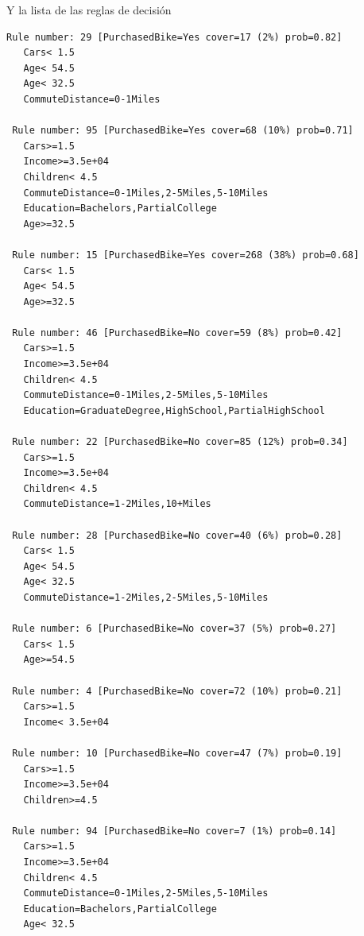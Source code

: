 \documentclass[11pt,a4paper]{report}
\begin{document}
\begin{itemize}
Y la lista de las reglas de decisión
\begin{verbatim}
Rule number: 29 [PurchasedBike=Yes cover=17 (2%) prob=0.82]
   Cars< 1.5
   Age< 54.5
   Age< 32.5
   CommuteDistance=0-1Miles

 Rule number: 95 [PurchasedBike=Yes cover=68 (10%) prob=0.71]
   Cars>=1.5
   Income>=3.5e+04
   Children< 4.5
   CommuteDistance=0-1Miles,2-5Miles,5-10Miles
   Education=Bachelors,PartialCollege
   Age>=32.5

 Rule number: 15 [PurchasedBike=Yes cover=268 (38%) prob=0.68]
   Cars< 1.5
   Age< 54.5
   Age>=32.5

 Rule number: 46 [PurchasedBike=No cover=59 (8%) prob=0.42]
   Cars>=1.5
   Income>=3.5e+04
   Children< 4.5
   CommuteDistance=0-1Miles,2-5Miles,5-10Miles
   Education=GraduateDegree,HighSchool,PartialHighSchool

 Rule number: 22 [PurchasedBike=No cover=85 (12%) prob=0.34]
   Cars>=1.5
   Income>=3.5e+04
   Children< 4.5
   CommuteDistance=1-2Miles,10+Miles

 Rule number: 28 [PurchasedBike=No cover=40 (6%) prob=0.28]
   Cars< 1.5
   Age< 54.5
   Age< 32.5
   CommuteDistance=1-2Miles,2-5Miles,5-10Miles

 Rule number: 6 [PurchasedBike=No cover=37 (5%) prob=0.27]
   Cars< 1.5
   Age>=54.5

 Rule number: 4 [PurchasedBike=No cover=72 (10%) prob=0.21]
   Cars>=1.5
   Income< 3.5e+04

 Rule number: 10 [PurchasedBike=No cover=47 (7%) prob=0.19]
   Cars>=1.5
   Income>=3.5e+04
   Children>=4.5

 Rule number: 94 [PurchasedBike=No cover=7 (1%) prob=0.14]
   Cars>=1.5
   Income>=3.5e+04
   Children< 4.5
   CommuteDistance=0-1Miles,2-5Miles,5-10Miles
   Education=Bachelors,PartialCollege
   Age< 32.5

\end{verbatim}

\end{itemize}	
\end{document}
